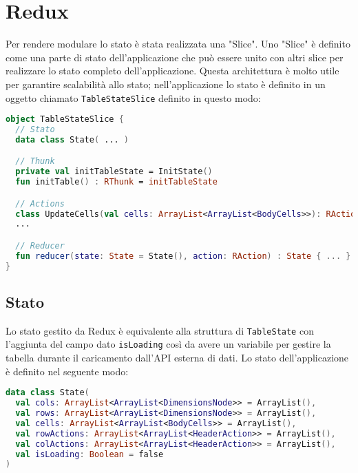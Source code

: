 \section{Redux}
Per rendere modulare lo stato è stata realizzata una "Slice". Uno "Slice" è definito come una parte di stato dell'applicazione che può essere unito con altri slice per realizzare lo stato completo dell'applicazione. Questa architettura è molto utile per garantire scalabilità allo stato; nell'applicazione lo stato è definito in un oggetto chiamato \verb|TableStateSlice| definito in questo modo:
\begin{lstlisting}[caption={BodyCells}, label={lst:bodycells}, language=Kotlin]
object TableStateSlice {
  // Stato
  data class State( ... )

  // Thunk
  private val initTableState = InitState()
  fun initTable() : RThunk = initTableState

  // Actions
  class UpdateCells(val cells: ArrayList<ArrayList<BodyCells>>): RAction
  ...

  // Reducer
  fun reducer(state: State = State(), action: RAction) : State { ... }
}

\end{lstlisting}

\subsection{Stato}
Lo stato gestito da Redux è equivalente alla struttura di \verb|TableState| con l'aggiunta del campo dato \verb|isLoading| così da avere un variabile per gestire la tabella durante il caricamento dall'API esterna di dati. Lo stato dell'applicazione è definito nel seguente modo:

\begin{lstlisting}[caption={BodyCells}, label={lst:bodycells}, language=Kotlin]
data class State(
  val cols: ArrayList<ArrayList<DimensionsNode>> = ArrayList(),
  val rows: ArrayList<ArrayList<DimensionsNode>> = ArrayList(),
  val cells: ArrayList<ArrayList<BodyCells>> = ArrayList(),
  val rowActions: ArrayList<ArrayList<HeaderAction>> = ArrayList(),
  val colActions: ArrayList<ArrayList<HeaderAction>> = ArrayList(),
  val isLoading: Boolean = false
)
\end{lstlisting}

